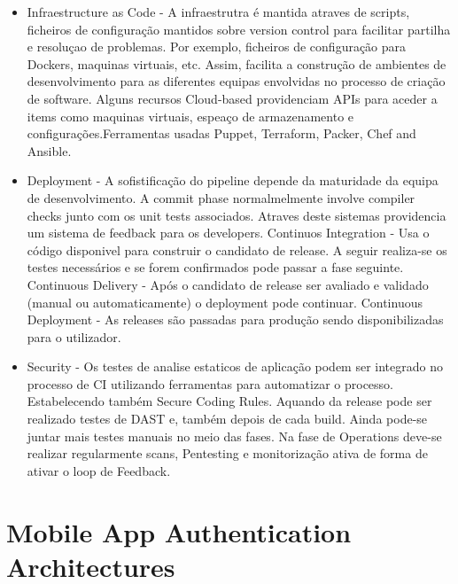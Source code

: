 \begin{itemize}

\item Infraestructure as Code - A infraestrutra é mantida atraves de scripts, ficheiros de configuração mantidos sobre version control para facilitar partilha e resoluçao de problemas. Por exemplo, ficheiros de configuração para Dockers, maquinas virtuais, etc. Assim, facilita a construção de ambientes de desenvolvimento para as diferentes equipas envolvidas no processo de criação de software.
Alguns recursos Cloud-based providenciam APIs para aceder a items como maquinas virtuais, espeaço de armazenamento e configurações.Ferramentas usadas Puppet, Terraform, Packer, Chef and Ansible.

\item Deployment - A sofistificação do pipeline depende da maturidade da equipa de desenvolvimento. A commit phase normalmelmente involve compiler checks junto com os unit tests associados. Atraves deste sistemas providencia um sistema de feedback para os developers. 
Continuos Integration - Usa o código disponivel para construir o candidato de release. A seguir realiza-se os testes necessários e se forem confirmados pode passar a fase seguinte.
Continuous Delivery -  Após o candidato de release ser avaliado e validado (manual ou automaticamente) o deployment pode continuar.
Continuous Deployment - As releases são passadas para produção sendo disponibilizadas para o utilizador.

\item Security - Os testes de analise estaticos de aplicação podem ser integrado no processo de CI utilizando ferramentas para automatizar o processo. Estabelecendo também Secure Coding Rules. Aquando da release pode ser realizado testes de DAST e, também depois de cada build. Ainda pode-se juntar mais testes manuais no meio das fases. Na fase de Operations deve-se realizar regularmente scans, Pentesting e monitorização ativa de forma de ativar o loop de Feedback.

\end{itemize}

\section{Mobile App Authentication Architectures}


